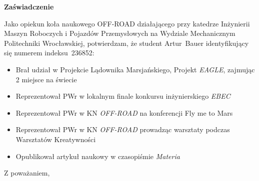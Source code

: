 \documentclass[11pt,a4paper]{letter} %
\date{Wrocław, 20 września 2018}
\begin{document}
\begin{letter}{}
\opening{}

\begin{center}
  \huge
  \textbf{Zaświadczenie}
\end{center}

 Jako opiekun koła naukowego OFF-ROAD działającego przy katedrze Inżynierii Maszyn Roboczych i Pojazdów Przemysłowych na Wydziale Mechanicznym Politechniki Wrocławskiej, potwierdzam, że student Artur~Bauer identyfikujący się numerem indeksu~236852:
\begin{itemize}
    \item Brał udział w Projekcie Lądownika Marsjańskiego, Projekt \textit{EAGLE}, zajmując 2 miejsce na świecie
    \item Reprezentował PWr w lokalnym finale konkursu inżynierskiego \textit{EBEC}
    \item Reprezentował PWr w KN \textit{OFF-ROAD} na konferencji Fly me to Mars
    \item Reprezentował PWr w KN \textit{OFF-ROAD} prowadząc warsztaty podczas Warsztatów Kreatywności 
    \item Opublikował artykuł naukowy w czasopiśmie \textit{Materia}
\end{itemize}
\closing{Z poważaniem,}

\end{letter}
\end{document}
